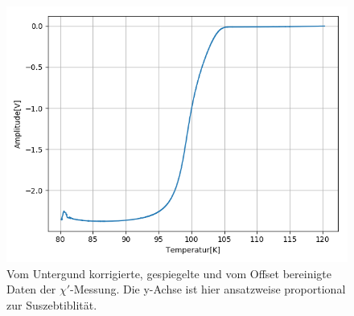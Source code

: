 \documentclass[12pt,a4paper]{article}
\begin{document}
\begin{figure}
\centering
\includegraphics[scale=0.8]{Bilder/Haupt_Supra/X1_spiegel.png}
\caption{Vom Untergund korrigierte, gespiegelte und vom Offset bereinigte Daten der $\chi'$-Messung. Die y-Achse ist hier ansatzweise proportional zur Suszebtiblität.}
\label{fig:Supra_X1spiegel}
\end{figure}
\end{document}
